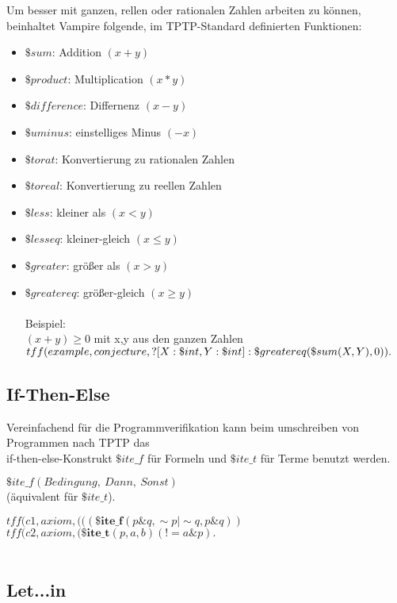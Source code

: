 \documentclass{article}
\begin{document}
Um besser mit ganzen, rellen oder rationalen Zahlen arbeiten zu können, beinhaltet Vampire folgende, im TPTP-Standard definierten Funktionen:
\begin{itemize}
	\item $\$sum$: Addition $(x + y)$
	\item $\$product$: Multiplication $(x * y)$
	\item $\$difference$: Differnenz $(x - y)$
	\item $\$uminus$: einstelliges Minus $(-x)$
	\item $\$to rat$: Konvertierung zu rationalen Zahlen
	\item $\$to real$: Konvertierung zu reellen Zahlen
	\item $\$less$: kleiner als $(x < y)$
	\item $\$lesseq$: kleiner-gleich $(x \leq y)$
	\item $\$greater$: größer als $(x > y)$
	\item $\$greatereq$: größer-gleich $(x \geq y)$ \\ \\
	Beispiel: \\ $(x + y) \geq 0$ mit x,y aus den ganzen Zahlen \\
	
	$tff(example,conjecture, \\ ? [X:\$int,Y:\$int]:
	\$greatereq(\$sum(X,Y),0)).$
	
\end{itemize}

\subsection{If-Then-Else}
\label{subsec:tptpitef}

Vereinfachend für die Programmverifikation kann beim umschreiben von Programmen nach TPTP das \\if-then-else-Konstrukt $ \$ite\_f $ für Formeln und $\$ite\_t$ für Terme benutzt werden.

$\$ite\_f(Bedingung,~Dann,~Sonst)$\\
(äquivalent für $\$ite\_t$).

$tff(c1,axiom,(((\textbf{\$ite\_f}(p\&q,\sim p|\sim q,p\&q))$\\

$tff(c2,axiom,(\textbf{\$ite\_t}(p,a,b)(!=a\&p).$\\ ~\cite{hoder2011slides}

\subsection{Let...in}
\label{subsec:tptpletin}
\end{document}
